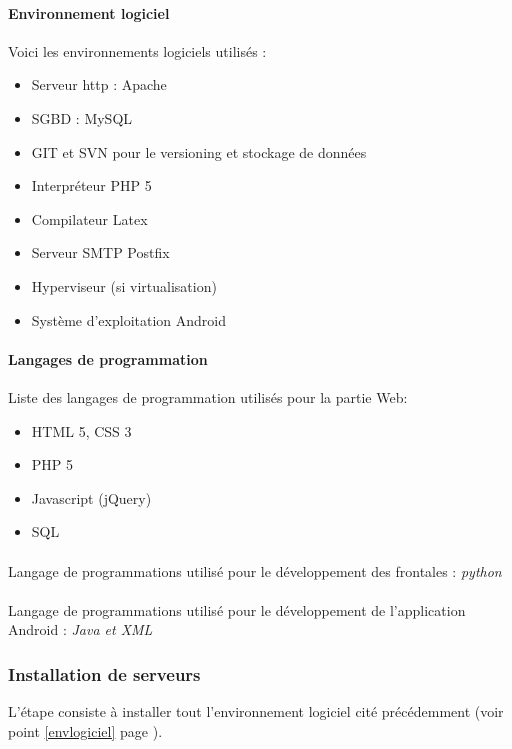\documentclass[a4paper,12pt]{article}
\begin{document}
\paragraph*{Environnement logiciel\\}
\label{envlogiciel}
Voici les environnements logiciels utilisés :
\begin{itemize}
 \item Serveur http : Apache
 \item SGBD : MySQL
 \item GIT et SVN pour le versioning et stockage de données
 \item Interpréteur PHP 5  
 \item Compilateur Latex
 \item Serveur SMTP Postfix
 \item Hyperviseur (si virtualisation)
 \item Système d'exploitation Android
\end{itemize}
 

\paragraph*{Langages de programmation\\}
Liste des langages de programmation utilisés pour la partie Web:
\begin{itemize}
 \item HTML 5, CSS 3
 \item PHP 5
 \item Javascript (jQuery)
 \item SQL
\end{itemize}

\paragraph*{}
Langage de programmations utilisé pour le développement des frontales : \emph{python}

\paragraph*{}
Langage de programmations utilisé pour le développement de l'application Android : \emph{Java et XML }


\subsubsection{Installation de serveurs}
L'étape consiste à installer tout l'environnement logiciel cité précédemment (voir point \ref{envlogiciel} page \pageref{envlogiciel}). 
\end{document}
